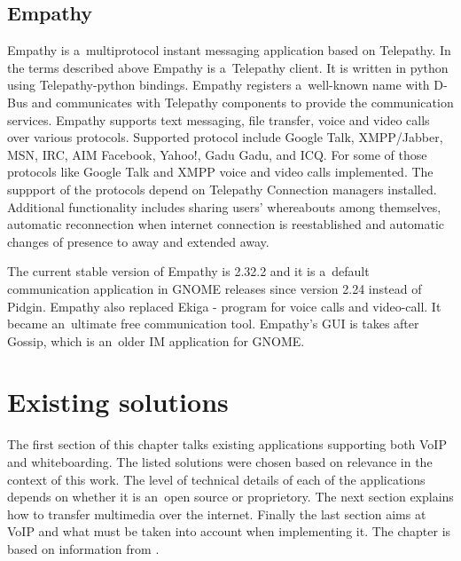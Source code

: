 
\section{Empathy}
Empathy is a~multiprotocol instant messaging application based on Telepathy. In the terms described above Empathy is a~Telepathy client. It is written in python using Telepathy-python bindings. Empathy registers a~well-known name with D-Bus and communicates with Telepathy components to provide the communication services. Empathy supports text messaging, file transfer, voice and video calls over various protocols. Supported protocol include Google Talk, XMPP/Jabber, MSN, IRC, AIM Facebook, Yahoo!, Gadu Gadu, and ICQ. For some of those protocols like Google Talk and XMPP voice and video calls implemented. The suppport of the protocols depend on Telepathy Connection managers installed. Additional functionality includes sharing users' whereabouts among themselves, automatic reconnection when internet connection is reestablished and automatic changes of presence to away and extended away.\cite{empathyGnome}

The current stable version of Empathy is 2.32.2 and it is a~default communication application in GNOME releases since version 2.24 instead of Pidgin. Empathy also replaced Ekiga - program for voice calls and video-call. It became an~ultimate free communication tool. Empathy's GUI is takes after Gossip, which is an~older IM application for GNOME. 


\chapter{Existing solutions}\label{chapter:existing-solutions}
The first section of this chapter talks existing applications supporting both VoIP and whiteboarding. The listed solutions were chosen based on relevance in the context of this work. The level of technical details of each of the applications depends on whether it is an~open source or proprietory. The next section explains how to transfer multimedia over the internet. Finally the last section aims at VoIP and what must be taken into account when implementing it. The chapter is based on information from \cite{skypeProtocolAnalysis,voipPaper,digitalSpeechBook}.

